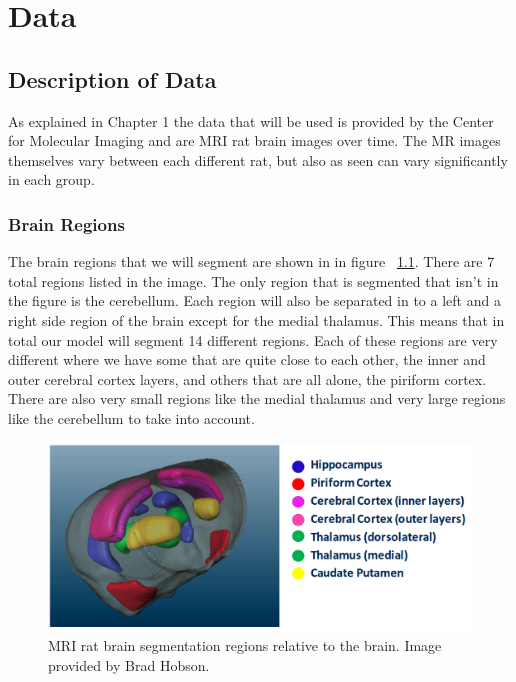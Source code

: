 \chapter{Data}

\section{Description of Data}
    As explained in Chapter 1 the data that will be used is provided by the Center for Molecular Imaging and are MRI rat brain images over time. 
    The MR images themselves vary between each different rat, but also as seen can vary significantly in each group.
\subsection{Brain Regions}
    The brain regions that we will segment are shown in in figure ~\ref{fig:segmentation regions}. 
    There are 7 total regions listed in the image. 
    The only region that is segmented that isn't in the figure is the cerebellum. 
    Each region will also be separated in to a left and a right side region of the brain except for the medial thalamus. 
    This means that in total our model will segment 14 different regions. 
    Each of these regions are very different where we have some that are quite close to each other, the inner and outer cerebral cortex layers, and others that are all alone, the piriform cortex. 
    There are also very small regions like the medial thalamus and very large regions like the cerebellum to take into account. 
    
\begin{figure}
  \centering
  \includegraphics[width=\linewidth]{segmentation_areas.png}
  \caption{MRI rat brain segmentation regions relative to the brain. Image provided by Brad Hobson. }
  \label{fig:segmentation regions}
\end{figure}

